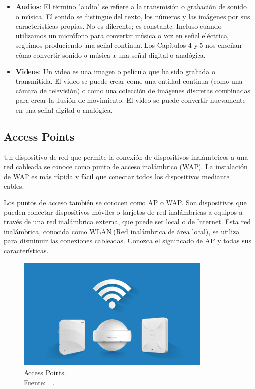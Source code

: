 \begin{itemize}
	\item \textbf{Audios}: El término "audio" se refiere a la transmisión o grabación de sonido o música. El sonido se distingue del texto, los números y las imágenes por sus características propias. No es diferente; es constante. Incluso cuando utilizamos un micrófono para convertir música o voz en señal eléctrica, seguimos produciendo una señal continua. Los Capítulos 4 y 5 nos enseñan cómo convertir sonido o música a una señal digital o analógica. \parencite{tec_singh2011perfommobil}
	\item \textbf{Videos}: Un video es una imagen o película que ha sido grabada o transmitida. El video se puede crear como una entidad continua (como una cámara de televisión) o como una colección de imágenes discretas combinadas para crear la ilusión de movimiento. El video se puede convertir nuevamente en una señal digital o analógica. \parencite{tec_karnik2005wirnetwo}
\end{itemize}

\subsection{Access Points}
Un dispositivo de red que permite la conexión de dispositivos inalámbricos a una red cableada se conoce como punto de acceso inalámbrico (WAP). La instalación de WAP es más rápida y fácil que conectar todos los dispositivos mediante cables. \parencite{ot_cisco2024queesap}

Los puntos de acceso también se conocen como AP o WAP. Son dispositivos que pueden conectar dispositivos móviles o tarjetas de red inalámbricas a equipos a través de una red inalámbrica externa, que puede ser local o de Internet. Esta red inalámbrica, conocida como WLAN (Red inalámbrica de área local), se utiliza para disminuir las conexiones cableadas. Conozca el significado de AP y todas sus características. \parencite{ot_ymant2023ap}

\begin{figure}[!ht]
	\begin{center}
		\includegraphics[width=0.85\textwidth]{2/figures/accesspoints.jpg}
		\caption[Access Points]{Access Points.\\
			Fuente: \cite{ot_cisco2024queesap}. .}
		\label{2:fig52}
	\end{center}
\end{figure}

